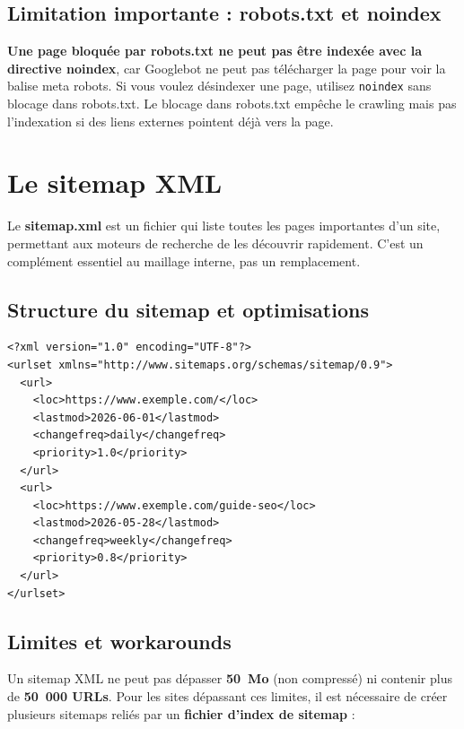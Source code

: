 \documentclass[12pt,a4paper,twoside]{report}
\newcommand{\keyword}[1]{\textbf{\textcolor{googleblue}{#1}}}
\newcommand{\important}[1]{\textbf{\textcolor{googlered}{#1}}}
\begin{document}
\subsection{Limitation importante : robots.txt et noindex}

\important{Une page bloquée par robots.txt ne peut pas être indexée avec la directive noindex}, car Googlebot ne peut pas télécharger la page pour voir la balise meta robots. Si vous voulez désindexer une page, utilisez \texttt{noindex} sans blocage dans robots.txt. Le blocage dans robots.txt empêche le crawling mais pas l'indexation si des liens externes pointent déjà vers la page.

\section{Le sitemap XML}

Le \keyword{sitemap.xml} est un fichier qui liste toutes les pages importantes d'un site, permettant aux moteurs de recherche de les découvrir rapidement. C'est un complément essentiel au maillage interne, pas un remplacement.

\subsection{Structure du sitemap et optimisations}

\begin{lstlisting}[style=htmlcode,caption={Exemple de sitemap.xml optimisé avec priorités et fréquences}]
<?xml version="1.0" encoding="UTF-8"?>
<urlset xmlns="http://www.sitemaps.org/schemas/sitemap/0.9">
  <url>
    <loc>https://www.exemple.com/</loc>
    <lastmod>2026-06-01</lastmod>
    <changefreq>daily</changefreq>
    <priority>1.0</priority>
  </url>
  <url>
    <loc>https://www.exemple.com/guide-seo</loc>
    <lastmod>2026-05-28</lastmod>
    <changefreq>weekly</changefreq>
    <priority>0.8</priority>
  </url>
</urlset>
\end{lstlisting}

\subsection{Limites et workarounds}

Un sitemap XML ne peut pas dépasser \textbf{50~Mo} (non compressé) ni contenir plus de \textbf{50~000 URLs}. Pour les sites dépassant ces limites, il est nécessaire de créer plusieurs sitemaps reliés par un \keyword{fichier d'index de sitemap} :
\end{document}
